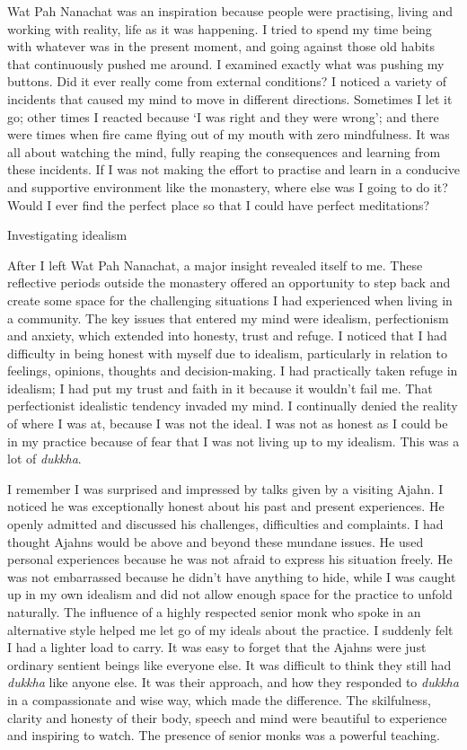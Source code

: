Wat Pah Nanachat was an inspiration because people were practising, 
living and working with reality, life as it was happening. I tried to
spend my time being with whatever was in the present moment, and going
against those old habits that continuously pushed me around. I examined
exactly what was pushing my buttons. Did it ever really come from
external conditions? I noticed a variety of incidents that caused my
mind to move in different directions. Sometimes I let it go; other times
I reacted because `I was right and they were wrong'; and there were
times when fire came flying out of my mouth with zero mindfulness. It
was all about watching the mind, fully reaping the consequences and
learning from these incidents. If I was not making the effort to
practise and learn in a conducive and supportive environment like the
monastery, where else was I going to do it? Would I ever find the
perfect place so that I could have perfect meditations? 

Investigating idealism

After I left Wat Pah Nanachat, a major insight revealed itself to me. 
These reflective periods outside the monastery offered an opportunity to
step back and create some space for the challenging situations I had
experienced when living in a community. The key issues that entered my
mind were idealism, perfectionism and anxiety, which extended into
honesty, trust and refuge. I noticed that I had difficulty in being
honest with myself due to idealism, particularly in relation to
feelings, opinions, thoughts and decision-making. I had practically
taken refuge in idealism; I had put my trust and faith in it because it
wouldn't fail me. That perfectionist idealistic tendency invaded my
mind. I continually denied the reality of where I was at, because I was
not the ideal. I was not as honest as I could be in my practice because
of fear that I was not living up to my idealism. This was a lot of
\emph{dukkha}. 

I remember I was surprised and impressed by talks given by a visiting
Ajahn. I noticed he was exceptionally honest about his past and present
experiences. He openly admitted and discussed his challenges, 
difficulties and complaints. I had thought Ajahns would be above and
beyond these mundane issues. He used personal experiences because he was
not afraid to express his situation freely. He was not embarrassed
because he didn't have anything to hide, while I was caught up in my own
idealism and did not allow enough space for the practice to unfold
naturally. The influence of a highly respected senior monk who spoke in
an alternative style helped me let go of my ideals about the practice. I
suddenly felt I had a lighter load to carry. It was easy to forget that
the Ajahns were just ordinary sentient beings like everyone else. It was
difficult to think they still had \emph{dukkha} like anyone else. It was
their approach, and how they responded to \emph{dukkha} in a
compassionate and wise way, which made the difference. The skilfulness, 
clarity and honesty of their body, speech and mind were beautiful to
experience and inspiring to watch. The presence of senior monks was a
powerful teaching. 

